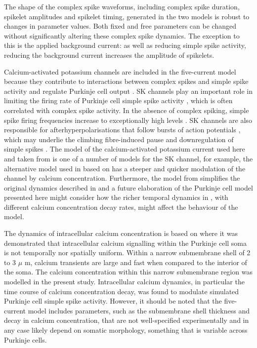 \documentclass[twocolumn]{svjour3}          %
\begin{document}
The shape of the complex spike waveforms, including complex spike
duration, spikelet amplitudes and spikelet timing, generated in the
two models is robust to changes in parameter values. Both fixed and
free parameters can be changed without significantly altering these
complex spike dynamics. The exception to this is the applied
background current: as well as reducing simple spike activity,
reducing the background current increases the amplitude of spikelets.

Calcium-activated potassium channels are included in the five-current
model because they contribute to interactions between complex spikes
and simple spike activity and regulate Purkinje cell output
\citep{TankEtAl1988,McKayEtAl2007}. SK channels play an important role
in limiting the firing rate of Purkinje cell simple spike activity
\citep{WomackEtAl2003,EgorovaEtAl2014}, which is often
correlated with complex spike activity. In the absence of complex
spiking, simple spike firing frequencies increase to exceptionally
high levels \citep{CerminaraRawson2004}. SK channels are also
responsible for afterhyperpolarisations that follow bursts of action
potentials \citep{HosyEtAl2011}, which may underlie the climbing
fibre-induced pause and downregulation of simple spikes
\citep{Xian-HuaEtAl2017}. The model of the calcium-activated potassium
current used here and taken from \citet{GilliesWillshaw2006} is one of
a number of models for the SK channel, for example, the alternative
model used in \citet{GriffithEtAl2016} based on
\citet{ChayKeizer1983,XiaEtAl1998} has a steeper and quicker modulation
of the channel by calcium concentration. Furthermore, the model from
\citet{GilliesWillshaw2006} simplifies the original dynamics described
in \citet{HirschbergEtAl1998} and a future elaboration of the Purkinje
cell model presented here might consider how the richer temporal
dynamics in \citet{HirschbergEtAl1998}, with different calcium
concentration decay rates, might affect the behaviour of the model.

The dynamics of intracellular calcium concentration is based on
\citet{EilersEtAl1995} where it was demonstrated that intracellular
calcium signalling within the Purkinje cell soma is not temporally nor
spatially uniform. Within a narrow submembrane shell of 2 to 3 $\mu$
m, calcium transients are large and fast when compared to the interior
of the soma. The calcium concentration within this narrow submembrane
region was modelled in the present study. Intracellular calcium
dynamics, in particular the time course of calcium concentration
decay, was found to modulate simulated Purkinje cell simple spike
activity. However, it should be noted that the five-current model
includes parameters, such as the submembrane shell thickness and decay
in calcium concentration, that are not well-specified experimentally
and in any case likely depend on somatic morphology, something that is
variable across Purkinje cells.
\end{document}
